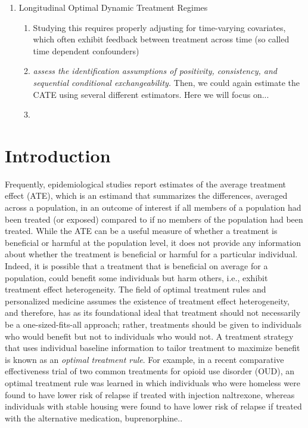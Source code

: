 \documentclass[11pt]{article}
\begin{document}
\begin{enumerate}
\begin{enumerate}
		
\end{enumerate}
\item Longitudinal Optimal Dynamic Treatment Regimes
\begin{enumerate}
	
	\item Studying this requires properly adjusting for time-varying covariates, which often exhibit feedback between treatment across time (so called time dependent confounders)
	
	\item \emph{assess the identification assumptions of positivity, consistency, and sequential conditional exchangeability.} Then, we could again estimate the CATE using several different estimators. Here we will focus on...
	\item 
		
	\end{enumerate}
\end{enumerate}


\section{Introduction}


Frequently, epidemiological studies report estimates of the average treatment effect (ATE), which is an estimand that summarizes the differences, averaged across a population, in an outcome of interest if all members of a population had been treated (or exposed) compared to if no members of the population had been treated. While the ATE can be a useful measure of whether a treatment is beneficial or harmful at the population level, it does not provide any information about whether the treatment is beneficial or harmful for a particular individual. Indeed, it is possible that a treatment that is beneficial on average for a population, could benefit some individuals but harm others, i.e., exhibit treatment effect heterogeneity. The field of optimal treatment rules and personalized medicine assumes the existence of treatment effect heterogeneity, and therefore, has as its foundational ideal that treatment should not necessarily be a one-sized-fits-all approach; rather, treatments should be given to individuals who would benefit but not to individuals who would not.\cite{} A treatment strategy that uses individual baseline information to tailor treatment to maximize benefit is known as an \textit{optimal treatment rule}.\cite{} For example, in a recent comparative effectiveness trial of two common treatments for opioid use disorder (OUD), an optimal treatment rule was learned in which individuals who were homeless were found to have lower risk of relapse if treated with injection naltrexone, whereas individuals with stable housing were found to have lower risk of relapse if treated with the alternative medication, buprenorphine.\cite{rudolph2021optimizing}. 
\end{document}
